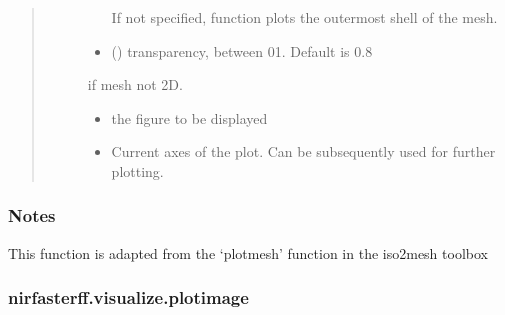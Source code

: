\documentclass[letterpaper,10pt,english]{sphinxmanual}
\begin{document}
\begin{fulllineitems}
\begin{quote}
\begin{description}
\begin{itemize}
\sphinxAtStartPar
If not specified, function plots the outermost shell of the mesh.


\item {} 
\sphinxAtStartPar
{} (\sphinxstyleliteralemphasis{\sphinxupquote{, }}) \textendash{} transparency, between 0\sphinxhyphen{}1. Default is 0.8

\end{itemize}

\sphinxAtStartPar
{} \textendash{} if mesh not 2D.

\sphinxAtStartPar
\begin{itemize}
\item {} 
\sphinxAtStartPar
{} \textendash{} the figure to be displayed

\item {} 
\sphinxAtStartPar
{} \textendash{} Current axes of the plot. Can be subsequently used for further plotting.

\end{itemize}


\end{description}\end{quote}
\subsubsection*{Notes}

\sphinxAtStartPar
This function is adapted from the ‘plotmesh’ function in the iso2mesh toolbox

\sphinxAtStartPar
{}

\end{fulllineitems}


\sphinxstepscope


\subsubsection{nirfasterff.visualize.plotimage}
\label{\detokenize{_autosummary/nirfasterff.visualize.plotimage:nirfasterff-visualize-plotimage}}\label{\detokenize{_autosummary/nirfasterff.visualize.plotimage::doc}}
\end{document}
